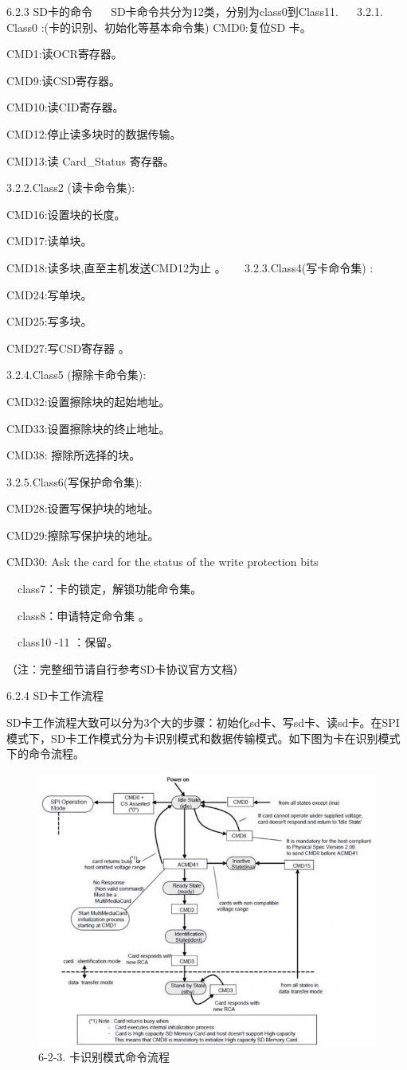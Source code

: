 6.2.3 SD卡的命令
　
SD卡命令共分为12类，分别为class0到Class11.
　
3.2.1. Class0 :(卡的识别、初始化等基本命令集)
CMD0:复位SD 卡。

CMD1:读OCR寄存器。

CMD9:读CSD寄存器。

CMD10:读CID寄存器。

CMD12:停止读多块时的数据传输。

CMD13:读 Card_Status 寄存器。

3.2.2.Class2 (读卡命令集):

CMD16:设置块的长度。

CMD17:读单块。

CMD18:读多块,直至主机发送CMD12为止 。
　
3.2.3.Class4(写卡命令集) :

CMD24:写单块。

CMD25:写多块。

CMD27:写CSD寄存器 。

3.2.4.Class5 (擦除卡命令集):

CMD32:设置擦除块的起始地址。

CMD33:设置擦除块的终止地址。

CMD38: 擦除所选择的块。


3.2.5.Class6(写保护命令集):

CMD28:设置写保护块的地址。

CMD29:擦除写保护块的地址。

CMD30: Ask the card for the status of the write protection bits

　class7：卡的锁定，解锁功能命令集。

　class8：申请特定命令集 。

　class10 -11 ：保留。

（注：完整细节请自行参考SD卡协议官方文档）

6.2.4 SD卡工作流程

SD卡工作流程大致可以分为3个大的步骤：初始化sd卡、写sd卡、读sd卡。在SPI模式下，SD卡工作模式分为卡识别模式和数据传输模式。如下图为卡在识别模式下的命令流程。

\begin{figure}[H]
    \centering
    \includegraphics{figures/06-02-命令流程.png}
    \caption{6-2-3. 卡识别模式命令流程}
\end{figure}

